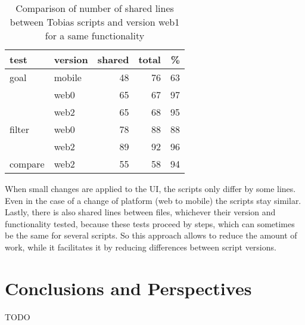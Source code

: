 \documentclass{chi-ext}
\begin{document}
\begin{table}
\begin{tabular}{|l l|r r r|}
\hline
test		&	version&	shared	&	total	&	\%	\\
\hline
goal		&	mobile	&	48		&	76		&	63	\\
			&	web0	&	65		&	67		&	97	\\
			&	web2	&	65		&	68		&	95	\\
\hline
filter		&	web0	&	78		&	88		&	88	\\
			&	web2	&	89		&	92		&	96	\\
\hline
compare	&	web2	&	55		&	58		&	94 \\
\hline
\end{tabular}
\caption{Comparison of number of shared lines between Tobias scripts and version web1 for a same functionality}
\label{table:scripts-similarity}
\end{table}
When small changes are applied to the UI, the scripts only differ by some lines. Even in the case of a change of platform (web to mobile) the scripts stay similar.
Lastly, there is also shared lines between files, whichever their version and functionality tested, because these tests proceed by steps, which can sometimes be the same for several scripts.
So this approach allows to reduce the amount of work, while it facilitates it by reducing differences between script versions.

\section{Conclusions and Perspectives}
TODO

\balance


\end{document}
